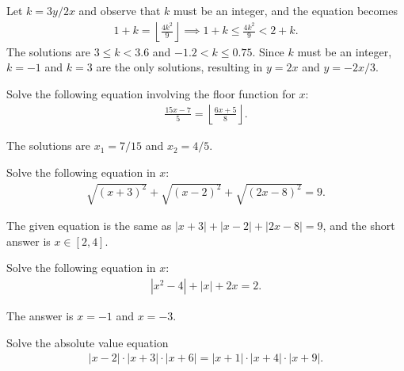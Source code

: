 \documentclass[12pt,a4paper]{memoir}
\theoremstyle{definition}
\begin{document}
\begin{solution}
	Let $k=3y/2x$ and observe that $k$ must be an integer, and the equation becomes
	\begin{align*}
		1+k = \left\lfloor \frac{4k^2}{9}\right\rfloor \implies 1+k \leq \frac{4k^2}{9} < 2+k.
	\end{align*}
	The solutions are $3\leq k <3.6$ and $-1.2 < k \leq 0.75$. Since $k$ must be an integer, $k=-1$ and $k=3$ are the only solutions, resulting in $y=2x$ and $y=-2x/3$.
\end{solution}


\begin{question}
	Solve the following equation involving the floor function for $x$:
	\begin{align*}
		\frac{15x-7}{5} = \left\lfloor \frac{6x+5}{8}\right\rfloor.
	\end{align*}
\end{question}

\begin{solution}
	The solutions are $x_1=7/15$ and $x_2=4/5$.
\end{solution}


\begin{question}
	Solve the following equation in $x$:
	\begin{align*}
		\sqrt{(x+3)^2}+\sqrt{(x-2)^2} + \sqrt{(2x-8)^2}=9.
	\end{align*}
\end{question}

\begin{solution}
	The given equation is the same as $|x+3|+|x-2|+|2x-8|=9$, and the short answer is $x\in [2,4]$.
\end{solution}


\begin{question}
	Solve the following equation in $x$:
	\begin{align*}
		|x^2-4|+|x|+2x=2.
	\end{align*}
\end{question}

\begin{solution}
	The answer is $x=-1$ and $x=-3$.
\end{solution}


\begin{question}
	Solve the absolute value equation
	\begin{align*}
		|x-2| \cdot |x+3| \cdot |x+6| = |x+1| \cdot |x+4| \cdot |x+9|.
	\end{align*}
\end{question}
\end{document}
